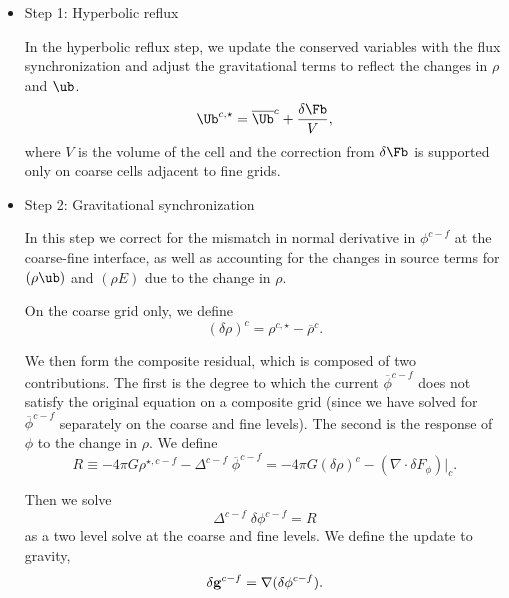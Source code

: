 \begin{itemize}
\item Step 1:  Hyperbolic reflux

In the hyperbolic reflux step, we update the conserved variables with the flux synchronization
and adjust the gravitational terms to reflect the changes in $\rho$ and $\ub$.
\begin{equation}
{\Ub}^{c, \star} = \overline{\Ub}^{c} + \frac{\delta\Fb}{V},
\end{equation}
where $V$ is the volume of the cell and the correction from $\delta\Fb$ is supported only on coarse cells adjacent to fine grids.   

\item Step 2:  Gravitational synchronization

In this step we correct for the mismatch in normal derivative in $\phi^{c-f}$ at the coarse-fine
interface, as well as accounting for the changes in source terms for $(\rho \ub)$
and $(\rho E)$ due to the change in $\rho.$

On the coarse grid only, we define
\begin{equation}
(\delta \rho)^{c} =  \rho^{c, \star} - {\overline{\rho}}^{c}  .
\end{equation}

We then form the composite residual, which is composed of two contributions.
The first is the degree to which the current $ \overline{\phi}^{c-f}$
does not satisfy the original equation on a composite grid (since we have solved for 
$\overline{\phi}^{c-f}$ separately on the coarse and fine levels).  The second
is the response of $\phi$ to the change in $\rho.$
We define 
\begin{equation} R \equiv  - 4 \pi G \rho^{\star,c-f} - \Delta^{c-f} \; \overline{\phi}^{c-f} 
= - 4 \pi G (\delta \rho)^c - (\nabla \cdot \delta F_\phi ) |_c   .
\end{equation}

Then we solve
\begin{equation}
 \Delta^{c-f} \; \delta \phi^{c-f} = R
\label{eq:gravsync}
\end{equation}
as a two level solve at the coarse and fine levels.  
We define the update to gravity,
\begin{equation}
\delta {\bf g}^{c-f} = \nabla (\delta \phi^{c-f})  .
\end{equation}


\end{itemize}
